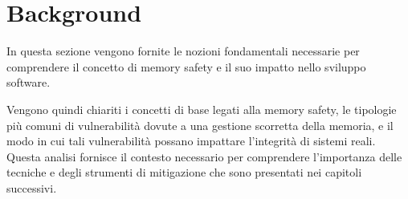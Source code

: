 \chapter{Background}
\label{cha:background}

In questa sezione vengono fornite le nozioni fondamentali necessarie per
comprendere il concetto di memory safety e il suo impatto nello sviluppo
software.

Vengono quindi chiariti i concetti di base legati alla memory safety, le tipologie
più comuni di vulnerabilità dovute a una gestione scorretta della memoria, e il
modo in cui tali vulnerabilità possano impattare l'integrità di sistemi reali. Questa
analisi fornisce il contesto necessario per comprendere l'importanza delle tecniche
e degli strumenti di mitigazione che sono presentati nei capitoli successivi.



